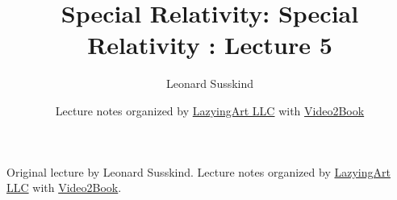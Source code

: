 \documentclass[11pt,oneside]{book}
\begin{document}
\frontmatter
\title{Special Relativity: Special Relativity : Lecture 5}
\author{Leonard Susskind}
\date{Lecture notes organized by \href{https://lazying.art}{LazyingArt LLC} with \href{https://github.com/lachlanchen/Video2Book}{Video2Book}}
\maketitle
\begin{center}
\small Original lecture by Leonard Susskind. Lecture notes organized by \href{https://lazying.art}{LazyingArt LLC} with \href{https://github.com/lachlanchen/Video2Book}{Video2Book}.
\end{center}
\clearpage
\mainmatter

\end{document}
